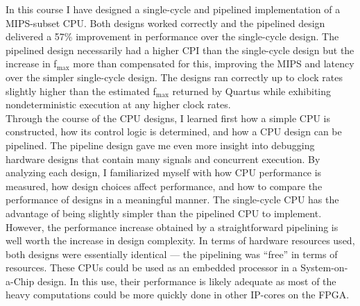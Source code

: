 \documentclass[12pt]{article}
\begin{document}
In this course I have designed a single-cycle and pipelined implementation of a MIPS-subset CPU. Both designs worked correctly and the pipelined design delivered a 57\% improvement in performance over the single-cycle design. The pipelined design necessarily had a higher CPI than the single-cycle design but the increase in f$_{\textrm{max}}$ more than compensated for this, improving the MIPS and latency over the simpler single-cycle design. The designs ran correctly up to clock rates slightly higher than the estimated f$_{\textrm{max}}$ returned by Quartus while exhibiting nondeterministic execution at any higher clock rates.\\

Through the course of the CPU designs, I learned first how a simple CPU is constructed, how its control logic is determined, and how a CPU design can be pipelined. The pipeline design gave me even more insight into debugging hardware designs that contain many signals and concurrent execution. By analyzing each design, I familiarized myself with how CPU performance is measured, how design choices affect performance, and how to compare the performance of designs in a meaningful manner. The single-cycle CPU has the advantage of being slightly simpler than the pipelined CPU to implement. However, the performance increase obtained by a straightforward pipelining is well worth the increase in design complexity. In terms of hardware resources used, both designs were essentially identical --- the pipelining was ``free'' in terms of resources. These CPUs could be used as an embedded processor in a System-on-a-Chip design. In this use, their performance is likely adequate as most of the heavy computations could be more quickly done in other IP-cores on the FPGA.\\
\end{document}
